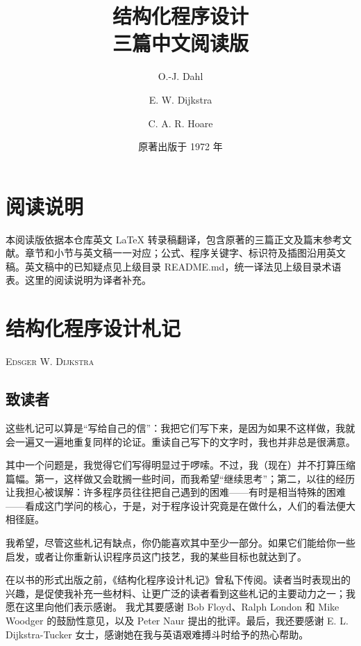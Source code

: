 \documentclass[twoside,11pt,fontset=none]{ctexbook}
\begin{document}
\frontmatter
\title{结构化程序设计\\\large 三篇中文阅读版}
\author{O.-J. Dahl \and E. W. Dijkstra \and C. A. R. Hoare}
\date{原著出版于 1972 年}
\maketitle
\chapter*{阅读说明}
本阅读版依据本仓库英文 LaTeX 转录稿翻译，包含原著的三篇正文及篇末参考文献。章节和小节与英文稿一一对应；公式、程序关键字、标识符及插图沿用英文稿。英文稿中的已知疑点见上级目录 README.md，统一译法见上级目录术语表。这里的阅读说明为译者补充。
\tableofcontents
\mainmatter
\pagestyle{myheadings}
\chapter{结构化程序设计札记}

{
	\noindent
	\scshape\hfill\scriptsize Edsger W. Dijkstra\hfill
}
\renewcommand{\leftmark}{\normalfont\scriptsize\hfill E. W. DIJKSTRA\hfill}
\medskip

\section[致读者]{致读者}

这些札记可以算是“写给自己的信”：我把它们写下来，是因为如果不这样做，我就会一遍又一遍地重复同样的论证。重读自己写下的文字时，我也并非总是很满意。

其中一个问题是，我觉得它们写得明显过于啰嗦。不过，我（现在）并不打算压缩篇幅。第一，这样做又会耽搁一些时间，而我希望“继续思考”；第二，以往的经历让我担心被误解：许多程序员往往把自己遇到的困难——有时是相当特殊的困难——看成这门学问的核心，于是，对于程序设计究竟是在做什么，人们的看法便大相径庭。

我希望，尽管这些札记有缺点，你仍能喜欢其中至少一部分。如果它们能给你一些启发，或者让你重新认识程序员这门技艺，我的某些目标也就达到了。

在以书的形式出版之前，《结构化程序设计札记》曾私下传阅。读者当时表现出的兴趣，是促使我补充一些材料、让更广泛的读者看到这些札记的主要动力之一；我愿在这里向他们表示感谢。
我尤其要感谢 Bob Floyd、Ralph London 和 Mike Woodger 的鼓励性意见，以及 Peter Naur 提出的批评。最后，我还要感谢 E. L. Dijkstra-Tucker 女士，感谢她在我与英语艰难搏斗时给予的热心帮助。
\end{document}
